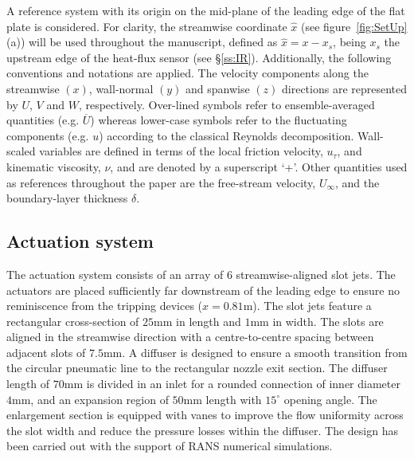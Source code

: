 A reference system with its origin on the mid-plane of the leading edge of the flat plate is considered. For clarity, the streamwise coordinate $\hat{x}$ (see figure~\ref{fig:SetUp}(a)) will be used throughout the manuscript, defined as $\hat{x} = x - x_{s}$, being $x_{s}$ the upstream edge of the heat-flux sensor (see \S\ref{ss:IR}). Additionally, the following conventions and notations are applied. The velocity components along the streamwise $(x)$, wall-normal $(y)$ and spanwise $(z)$ directions are represented by $U$, $V$ and $W$, respectively. Over-lined symbols refer to ensemble-averaged quantities (e.g. $\overline{U}$) whereas lower-case symbols refer to the fluctuating components (e.g. $u$) according to the classical Reynolds decomposition. Wall-scaled variables are defined in terms of the local friction velocity, $u_\tau$, and kinematic viscosity, $\nu$, and are denoted by a superscript ‘+’. Other quantities used as references throughout the paper are the free-stream velocity, $U_\infty$, and the boundary-layer thickness $\delta$. 

\subsection{Actuation system \label{ss:actuator}}

The actuation system consists of an array of $6$ streamwise-aligned slot jets. The actuators are placed sufficiently far downstream of the leading edge to ensure no reminiscence from the tripping devices ($x = 0.81\mathrm{m}$). The slot jets feature a rectangular cross-section of $25 \mathrm{mm}$ in length and $1 \mathrm{mm}$ in width. The slots are aligned in the streamwise direction with a centre-to-centre spacing between adjacent slots of $7.5 \mathrm{mm}$. A diffuser is designed to ensure a smooth transition from the circular pneumatic line to the rectangular nozzle exit section. The diffuser length of $70 \mathrm{mm}$ is divided in an inlet for a rounded connection of inner diameter $4 \mathrm{mm}$, and an expansion region of $50 \mathrm{mm}$ length with $15^\circ$ opening angle. The enlargement section is equipped with vanes to improve the flow uniformity across the slot width and reduce the pressure losses within the diffuser. The design has been carried out with the support of RANS numerical simulations.  

